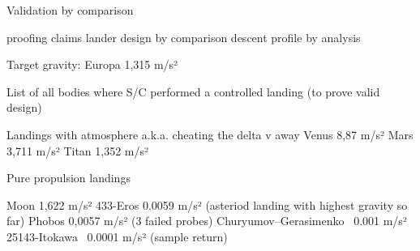 
Validation by comparison 

proofing claims
	lander design by comparison
	descent profile by analysis



Target gravity: Europa 1,315 m/s²

List of all bodies where S/C performed a controlled landing (to prove valid design)

	Landings with atmosphere a.k.a. cheating the  delta v away
		Venus 8,87 m/s²
		Mars 3,711 m/s²
		Titan 1,352 m/s²

	Pure propulsion landings

		Moon 1,622 m/s²
		433-Eros 0.0059 m/s² (asteriod landing with highest gravity so far)
		Phobos 0,0057 m/s² (3 failed probes)
		Churyumov–Gerasimenko ~0.001 m/s²
		25143-Itokawa ~0.0001 m/s² (sample return)
